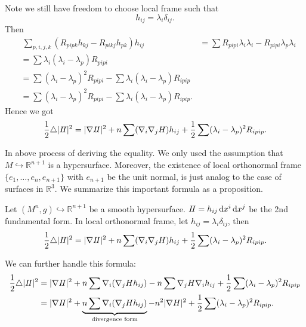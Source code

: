Note we still have freedom to choose local frame such that \[
    h_{ij}=\lambda_i\delta_{ij}
.\] Then 
\begin{align*}
    &\ \sum_{p,i,j,k}(R_{pipk}h_{kj}-R_{pikj}h_{pk})h_{ij}
    &=\sum R_{pipi}\lambda_i\lambda_i-R_{pipi}\lambda_p\lambda_i \\ 
    &=\sum \lambda_i(\lambda_i-\lambda_p)R_{pipi} \\
    &=\sum(\lambda_i-\lambda_p)^2R_{pipi}-\sum\lambda_i(\lambda_i-\lambda_p)R_{ipip} \\
    &=\sum(\lambda_i-\lambda_p)^2R_{pipi}-\sum\lambda_i(\lambda_i-\lambda_p)R_{ipip}
.\end{align*}
Hence we got \[
    \frac{1}{2}\triangle|I\!I|^2=|\nabla I\!I|^2+n\sum(\nabla_i\nabla_j H)h_{ij}
    +\frac{1}{2}\sum (\lambda_i-\lambda_p)^2R_{ipip}
.\] 
\begin{remark}
    In above process of deriving the equality. We only used the assumption that
    \(M\hookrightarrow \mathbb{R}^{n+1}\) is a hypersurface. Moreover, the existence
    of local orthonormal frame \(\{e_1,\ldots,e_n,e_{n+1}\}\) with \(e_{n+1}\) be the
    unit normal, is just analog to the case of surfaces in \(\mathbb{R}^3\). We
    summarize this important formula as a proposition.
\end{remark}

\begin{prop}
    Let \((M^n,g)\hookrightarrow\mathbb{R}^{n+1}\) be a smooth hypersurface.
    \(I\!I=h_{ij}\dd{x^i}\dd{x^j}\) be the 2nd fundamental form. In local orthonormal
    frame, let \(h_{ij}=\lambda_i\delta_{ij}\), then \[
        \frac{1}{2}\triangle|I\!I|^2=|\nabla I\!I|^2+n\sum(\nabla_i\nabla_j H)h_{ij}
        +\frac{1}{2}\sum (\lambda_i-\lambda_p)^2R_{ipip}
    .\] 
\end{prop}
We can further handle this formula:
\begin{align*}
    \frac{1}{2}\triangle|I\!I|^2&=|\nabla I\!I|^2+n\sum\nabla_i(\nabla_j H h_{ij})
    -n\sum\nabla_j H\nabla_i h_{ij}+\frac{1}{2}\sum (\lambda_i-\lambda_p)^2R_{ipip} \\
    &=|\nabla I\!I|^2+\underbrace{n\sum\nabla_i(\nabla_j H h_{ij})}_{\text{divergence
    form}}-n^2|\nabla H|^2+\frac{1}{2}\sum(\lambda_i-\lambda_p)^2R_{ipip}
.\end{align*}

